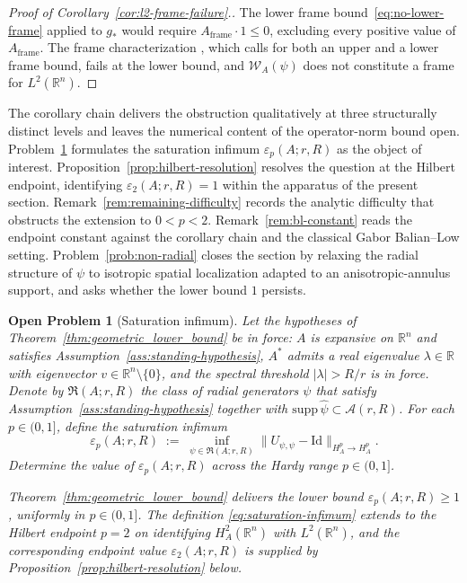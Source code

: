 \documentclass[pdflatex,sn-basic,Numbered]{sn-jnl}
\theoremstyle{thmstyleone}%
\theoremstyle{thmstylethree}%
\newtheorem{openproblem}[theorem]{Open Problem}
\begin{document}
\begin{proof}[Proof of Corollary~\ref{cor:l2-frame-failure}.]
	The lower frame bound~\eqref{eq:no-lower-frame} applied to $g_*$
	would require $A_{\mathrm{frame}} \cdot 1 \le 0$, excluding every
	positive value of $A_{\mathrm{frame}}$. The frame characterization
	\cite[Chapter~5]{Christensen2016}, which calls for both an upper
	and a lower frame bound, fails at the lower bound, and
	$\mathcal{W}_A(\psi)$ does not constitute a frame for
	$L^2(\mathbb{R}^n)$.
\end{proof}

The corollary chain delivers the obstruction qualitatively at three
structurally distinct levels and leaves the numerical content of the
operator-norm bound open.
Problem~\ref{prob:sharp_constant} formulates the saturation infimum
$\varepsilon_p(A; r, R)$ as the object of interest.
Proposition~\ref{prop:hilbert-resolution} resolves the question at
the Hilbert endpoint, identifying $\varepsilon_2(A; r, R) = 1$
within the apparatus of the present section.
Remark~\ref{rem:remaining-difficulty} records the analytic
difficulty that obstructs the extension to $0 < p < 2$.
Remark~\ref{rem:bl-constant} reads the endpoint constant against
the corollary chain and the classical Gabor Balian--Low setting.
Problem~\ref{prob:non-radial} closes the section by relaxing the
radial structure of $\psi$ to isotropic spatial localization adapted
to an anisotropic-annulus support, and asks whether the lower bound
$1$ persists.


\begin{openproblem}[Saturation infimum]\label{prob:sharp_constant}
	Let the hypotheses of Theorem~\ref{thm:geometric_lower_bound} be in
	force: $A$ is expansive on $\mathbb{R}^n$ and satisfies
	Assumption~\ref{ass:standing-hypothesis}, $A^{*}$ admits a real
	eigenvalue $\lambda \in \mathbb{R}$ with eigenvector
	$v \in \mathbb{R}^n \setminus \{0\}$, and the spectral threshold
	$|\lambda| > R/r$ is in force. Denote by $\mathfrak{R}(A; r, R)$
	the class of radial generators $\psi$ that satisfy
	Assumption~\ref{ass:standing-hypothesis} together with
	$\mathrm{supp}\, \widehat{\psi} \subset \mathcal{A}(r, R)$. For
	each $p \in (0, 1]$, define the saturation infimum
	\begin{equation}\label{eq:saturation-infimum}
		\varepsilon_p(A; r, R)
		\;:=\; \inf_{\psi \in \mathfrak{R}(A; r, R)}
		\bigl\| U_{\psi, \psi} - \mathrm{Id} \bigr\|_{H^p_A \to H^p_A} .
	\end{equation}
	Determine the value of $\varepsilon_p(A; r, R)$ across the Hardy
	range $p \in (0, 1]$.
	
	Theorem~\ref{thm:geometric_lower_bound} delivers the lower bound
	$\varepsilon_p(A; r, R) \ge 1$, uniformly in $p \in (0, 1]$. The
	definition \eqref{eq:saturation-infimum} extends to the Hilbert
	endpoint $p = 2$ on identifying $H^2_A(\mathbb{R}^n)$ with
	$L^2(\mathbb{R}^n)$, and the corresponding endpoint value
	$\varepsilon_2(A; r, R)$ is supplied by
	Proposition~\ref{prop:hilbert-resolution} below.
\end{openproblem}
\end{document}
